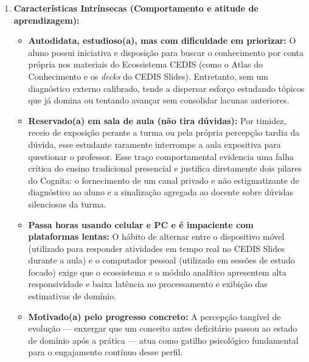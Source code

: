 \begin{enumerate}
    \item \textbf{Características Intrínsecas (Comportamento e atitude de aprendizagem):}
    \begin{itemize}
        \item \textbf{Autodidata, estudioso(a), mas com dificuldade em priorizar:} O aluno possui iniciativa e disposição para buscar o conhecimento por conta própria nos materiais do Ecossistema CEDIS (como o Atlas do Conhecimento e os \textit{decks} do CEDIS Slides). Entretanto, sem um diagnóstico externo calibrado, tende a dispersar esforço estudando tópicos que já domina ou tentando avançar sem consolidar lacunas anteriores.
        \item \textbf{Reservado(a) em sala de aula (não tira dúvidas):} Por timidez, receio de exposição perante a turma ou pela própria percepção tardia da dúvida, esse estudante raramente interrompe a aula expositiva para questionar o professor. Esse traço comportamental evidencia uma falha crítica do ensino tradicional presencial e justifica diretamente dois pilares do Cognita: o fornecimento de um canal privado e não estigmatizante de diagnóstico ao aluno e a sinalização agregada ao docente sobre dúvidas silenciosas da turma.
        \item \textbf{Passa horas usando celular e PC e é impaciente com plataformas lentas:} O hábito de alternar entre o dispositivo móvel (utilizado para responder atividades em tempo real no CEDIS Slides durante a aula) e o computador pessoal (utilizado em sessões de estudo focado) exige que o ecossistema e o módulo analítico apresentem alta responsividade e baixa latência no processamento e exibição das estimativas de domínio.
        \item \textbf{Motivado(a) pelo progresso concreto:} A percepção tangível de evolução — enxergar que um conceito antes deficitário passou ao estado de domínio após a prática — atua como gatilho psicológico fundamental para o engajamento contínuo desse perfil.
    \end{itemize}


\end{enumerate}
